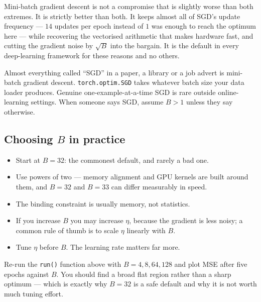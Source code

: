 \documentclass[11pt]{article}
\begin{document}
\begin{keyidea}
Mini-batch gradient descent is not a compromise that is slightly worse than
both extremes. It is strictly better than both. It keeps almost all of SGD's
update frequency --- $14$ updates per epoch instead of $1$ was enough to reach
the optimum here --- while recovering the vectorised arithmetic that makes
hardware fast, and cutting the gradient noise by $\sqrt{B}$ into the bargain.
It is the default in every deep-learning framework for these reasons and no
others.
\end{keyidea}

\begin{caution}
Almost everything called ``SGD'' in a paper, a library or a job advert is
mini-batch gradient descent. \texttt{torch.optim.SGD} takes whatever batch size
your data loader produces. Genuine one-example-at-a-time SGD is rare outside
online-learning settings. When someone says SGD, assume $B > 1$ unless they say
otherwise.
\end{caution}

\subsection{Choosing $B$ in practice}

\begin{itemize}[leftmargin=*]
  \item Start at $B = 32$: the commonest default, and rarely a bad one.
  \item Use powers of two --- memory alignment and GPU kernels are built around
    them, and $B=32$ and $B=33$ can differ measurably in speed.
  \item The binding constraint is usually memory, not statistics.
  \item If you increase $B$ you may increase $\eta$, because the gradient is
    less noisy; a common rule of thumb is to scale $\eta$ linearly with $B$.
  \item Tune $\eta$ before $B$. The learning rate matters far more.
\end{itemize}

\begin{tryit}
Re-run the \texttt{run()} function above with $B = 4, 8, 64, 128$ and plot MSE
after five epochs against $B$. You should find a broad flat region rather than
a sharp optimum --- which is exactly why $B=32$ is a safe default and why it is
not worth much tuning effort.
\end{tryit}
\end{document}
